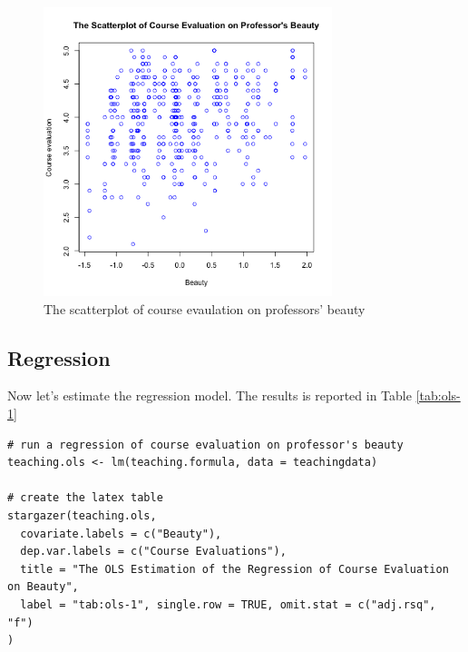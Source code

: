 \documentclass[a4paper,11pt]{article}
\begin{document}
\begin{figure}[htbp]
\centering
\includegraphics[width=0.75\textwidth]{beauty.png}
\caption{\label{fig:org2c95145}
The scatterplot of course evaulation on professors' beauty}
\end{figure}


\subsection*{Regression}
\label{sec:org80f26a9}

Now let's estimate the regression model. The results is reported
in Table \ref{tab:ols-1}

\begin{verbatim}
# run a regression of course evaluation on professor's beauty
teaching.ols <- lm(teaching.formula, data = teachingdata)

# create the latex table
stargazer(teaching.ols,
  covariate.labels = c("Beauty"),
  dep.var.labels = c("Course Evaluations"),
  title = "The OLS Estimation of the Regression of Course Evaluation on Beauty",
  label = "tab:ols-1", single.row = TRUE, omit.stat = c("adj.rsq", "f")
)
\end{verbatim}
\end{document}
